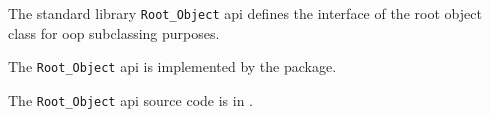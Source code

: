 
The standard library {\tt Root\_Object} api defines the interface of the root object class for oop subclassing purposes.

The {\tt Root\_Object} api is implemented by the  package.

The {\tt Root\_Object} api source code is in .




